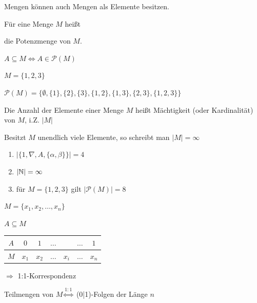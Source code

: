 Mengen können auch Mengen als Elemente besitzen.

\Def Für eine Menge $M$ heißt


die Potenzmenge von $M$.

\Bem $A\subseteq M \Leftrightarrow A\in \mathcal{P}(M)$

\Bsp $M=\{1,2,3\}$

$\mathcal{P}(M) = \{\emptyset, \{1\},\{2\},\{3\},\{1,2\},\{1,3\},\{2,3\},\{1,2,3\}\}$

\Def Die Anzahl der Elemente einer Menge $M$ heißt Mächtigkeit (oder Kardinalität) von $M$, i.Z. $\left|M\right|$

Besitzt $M$ unendlich viele Elemente, so schreibt man $\left|M\right| = \infty$

\Bsps
\begin{enumerate}
	\item $\left|\{1,\nabla,A,\{\alpha,\beta\}\}\right|=4$
	\item $\left|\mathbb{N}\right| = \infty$
	\item für $M = \{1,2,3\}$ gilt $\left|\mathcal{P}(M)\right| = 8$
\end{enumerate}


\Beweis
$M= \{x_1,x_2,\ldots,x_n\}$

$A\subseteq M$

\begin{center}
	\begin{tabular}{c|c|c|c|c|c|c}
		$A$ & $0$ & $1$ & $\ldots$ &  & $\ldots$ & $1$ \\ \hline
		$M$ & $x_1$ & $x_2$ & $\ldots$ & $x_i$ & $\ldots$ & $x_n$ \\
	\end{tabular}
\end{center}

$\Rightarrow$ 1:1-Korrespondenz

Teilmengen von $M \stackrel{1:1}{\Longleftrightarrow}$ (0|1)-Folgen der Länge $n$


